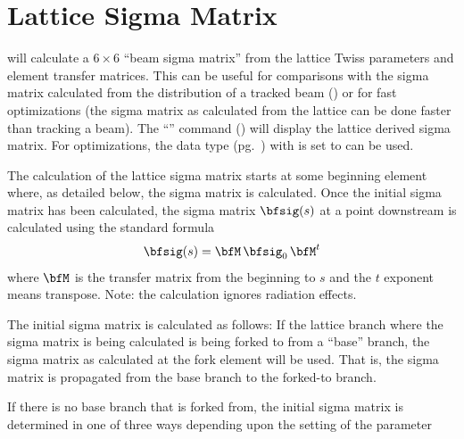 {{{{{{{{{{{{%
\section{Lattice Sigma Matrix}
\label{s:lat.sig.init}

\tao will calculate a $6\times6$ ``beam sigma matrix'' from the lattice Twiss parameters and element
transfer matrices. This can be useful for comparisons with the sigma matrix calculated from the
distribution of a tracked beam () or for fast optimizations (the sigma matrix as
calculated from the lattice can be done faster than tracking a beam). The ``'' command () will display the lattice derived sigma matrix. For
optimizations, the  data type (pg.~) with  is set to 
can be used.

The calculation of the lattice sigma matrix starts at some beginning element where, as detailed
below, the sigma matrix is calculated. Once the initial sigma matrix has been calculated, the sigma
matrix $\bfsig(s)$ at a point downstream is calculated using the standard formula
\begin{equation}
  \bfsig(s) = \bfM \, \bfsig_0 \, \bfM^t
\end{equation}
where $\bfM$ is the transfer matrix from the beginning to $s$ and the $t$ exponent means
transpose. Note: the calculation ignores radiation effects. 

The initial sigma matrix is calculated as follows: If the lattice branch where the sigma matrix is
being calculated is being forked to from a ``base'' branch, the sigma matrix as calculated at the
fork element will be used. That is, the sigma matrix is propagated from the base branch to the
forked-to branch.

If there is no base branch that is forked from, the initial sigma matrix is determined in one of
three ways depending upon the setting of the parameter \vn{global%
(\sref{s:tao.global.struct}). Possible settings of this parameter are:
\begin{example}
  "lat_or_beam_init"  ! Default. Calculated from the lattice For closed geometry branches and
                      !   from the beam_init structure of open geometry branches. 
  "beam"          ! Calculated from the beam.
  "beam_init"     ! Calculated from the beam_init structure.
\end{example}
If \vn{global%
by the initial beam distribution used with beam tracking (\sref{s:beam.init}). 

}}}}}}}}}}}}}}

